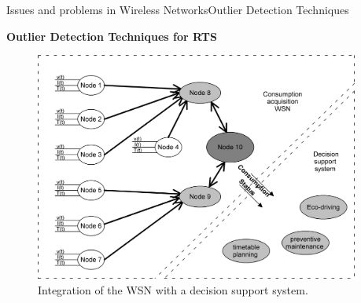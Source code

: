 \begin{frame}{Issues and problems in Wireless Networks}{Outlier Detection Techniques}
\begin{block}{\textbf{Outlier Detection Techniques for RTS}}
\begin{minipage}[t]{0.38\linewidth}
		\begin{figure}[ht!]
			\centering
			\includegraphics[width=0.95\textwidth,keepaspectratio]{figures/36.Outlier/general}
			\caption{Integration of the \ac{WSN} with a decision support system. }
		\end{figure}
		
	\end{minipage}
	
\end{block}
\end{frame}
